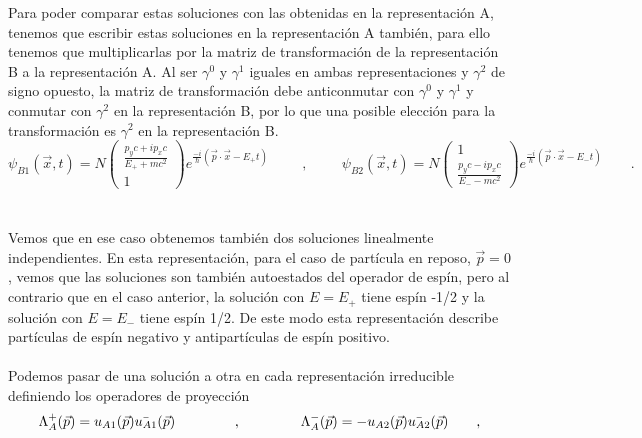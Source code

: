 \documentclass[11pt,letterpaper]{article}     %
\begin{document}
Para poder comparar estas soluciones con las obtenidas en la representación A, tenemos que escribir estas soluciones en la representación A también, para ello tenemos que multiplicarlas por la matriz de transformación de la representación B a la representación A. Al ser $\gamma^0$ y $\gamma^1$ iguales en ambas representaciones y $\gamma^2$ de signo opuesto, la matriz de transformación debe anticonmutar con $\gamma^0$ y $\gamma^1$ y conmutar con $\gamma^2$ en la representación B, por lo que una posible elección para la transformación es $\gamma^2$ en la representación B. \\
\begin{equation} \label{eq:126}
\psi_{B1} (\vec{x},t)=N 
\begin{pmatrix}
 \frac{p_yc+ip_xc}{E_+ +mc^2} \\ 1
\end{pmatrix} e^{\frac{-i}{\hbar}(\vec{p}\cdot \vec{x} -E_+ t)} \hspace{1cm} , \hspace{1cm}
\psi _{B2} (\vec{x},t)= N
\begin{pmatrix}
1 \\ \frac{p_yc-ip_xc}{E_- - mc^2}
\end{pmatrix} e^{\frac{-i}{\hbar}(\vec{p}\cdot \vec{x} - E_- t)} \qquad .
\end{equation} \\ \\
Vemos que en ese caso obtenemos también dos soluciones linealmente independientes. En esta representación, para el caso de partícula en reposo, $\vec{p}=0$, vemos que las soluciones son también autoestados del operador de espín, pero al contrario que en el caso anterior, la solución con $E=E_+$ tiene espín -1/2 y la solución con $E=E_-$ tiene espín 1/2. De este modo esta representación describe partículas de espín negativo y antipartículas de espín positivo. \\ \\
Podemos pasar de una solución a otra en cada representación irreducible definiendo los operadores de proyección \\
\begin{equation} \label{eq:127}
\Lambda_A^+(\vec{p})=u_{A1}(\vec{p}) \bar{u_{A1}}(\vec{p}) \hspace{1.5cm}, \hspace{1.5cm} \Lambda_A^-(\vec{p})=-u_{A2}(\vec{p}) \bar{u_{A2}}(\vec{p}) \qquad ,
\end{equation} \\ \\
\end{document}
